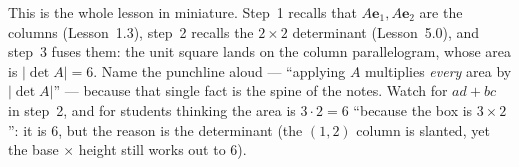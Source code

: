 \documentclass[10pt]{article}
\newcommand{\ee}{\mathbf{e}}
\begin{document}
\begin{teachernote}
This is the whole lesson in miniature. Step~1 recalls that $A\ee_1,A\ee_2$ are the columns (Lesson~1.3),
step~2 recalls the $2\times2$ determinant (Lesson~5.0), and step~3 fuses them: the unit square lands on
the column parallelogram, whose area is $|\det A|=6$. Name the punchline aloud --- ``applying $A$
multiplies \emph{every} area by $|\det A|$'' --- because that single fact is the spine of the notes.
Watch for $ad+bc$ in step~2, and for students thinking the area is $3\cdot2=6$ ``because the box is
$3\times2$'': it is $6$, but the reason is the determinant (the $(1,2)$ column is slanted, yet the base
$\times$ height still works out to $6$).
\end{teachernote}
\end{document}
